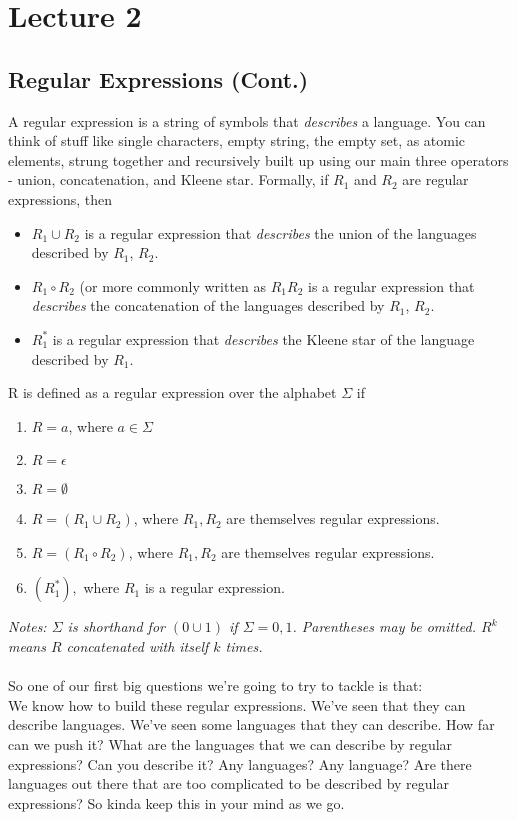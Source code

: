 \documentclass[a4paper, 12pt, margin=1.2in]{article}
\begin{document}
\newpage
\section{Lecture 2}
\subsection{Regular Expressions (Cont.)}
A regular expression is a string of symbols that \textit{describes} a language. You can think of stuff like single characters, empty string, the empty set, as atomic elements, strung together and recursively built up using our main three operators - union, concatenation, and Kleene star. Formally, if $R_1$ and $R_2$ are regular expressions, then
\begin{itemize}
    \item $R_1 \cup R_2$ is a regular expression that \textit{describes} the union of the languages described by $R_1$, $R_2$.
    \item $R_1 \circ R_2$ (or more commonly written as $R_1R_2$ is a regular expression that \textit{describes} the concatenation of the languages described by $R_1$, $R_2$.
    \item $R_1^*$ is a regular expression that \textit{describes} the Kleene star of the language described by $R_1$.
\end{itemize}
R is defined as a regular expression over the alphabet $\Sigma$ if
\begin{enumerate}
    \item $R = a$, where $a \in \Sigma$
    \item $R = \epsilon$
    \item $R = \emptyset$
    \item $R = (R_1 \cup R_2)$, where $R_1, R_2$ are themselves regular expressions.
    \item $R = (R_1 \circ R_2)$, where $R_1, R_2$ are themselves regular expressions.
    \item $(R_1^*),$ where $R_1$ is a regular expression.
\end{enumerate}
\textit{Notes: $\Sigma$ is shorthand for $(0 \cup 1)$ if $\Sigma = {0, 1}$. Parentheses may be omitted. $R^k$ means $R$ concatenated with itself $k$ times. } \\ \\
So one of our first big questions we're going to try to tackle is that:\\ We know how to build these regular expressions. We've seen that they can describe languages. We've seen some languages that they can describe. How far can we push it? What are the languages that we can describe by regular expressions? Can you describe it? Any languages? Any language? Are there languages out there that are too complicated to be described by regular expressions? So kinda keep this in your mind as we go. \\ \\
\end{document}
